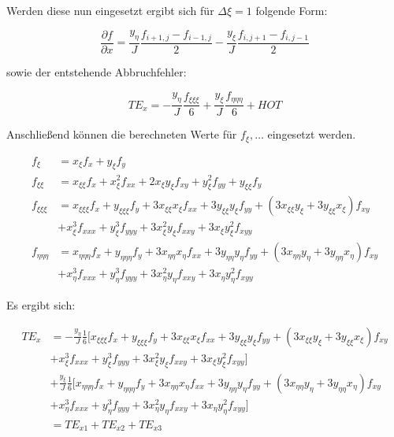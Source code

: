 \documentclass[11pt, ngerman,colorback,accentcolor=tud2d]{tudreport}
\newcommand{\pderf}[1]{\frac{\partial f}{\partial#1}}
\newcommand{\fxi}{f_{\xi}}
\newcommand{\fxxi}{f_{\xi\xi}}
\newcommand{\fxxxi}{f_{\xi\xi\xi}}
\newcommand{\xxi}{x_{\xi}}
\newcommand{\xxxi}{x_{\xi\xi}}
\newcommand{\xxxxi}{x_{\xi\xi\xi}}
\newcommand{\yxi}{y_{\xi}}
\newcommand{\yxxi}{y_{\xi\xi}}
\newcommand{\yxxxi}{y_{\xi\xi\xi}}
\newcommand{\feeeta}{f_{\eta\eta\eta}}
\newcommand{\xeta}{x_{\eta}}
\newcommand{\xeeta}{x_{\eta\eta}}
\newcommand{\xeeeta}{x_{\eta\eta\eta}}
\newcommand{\yeta}{y_{\eta}}
\newcommand{\yeeta}{y_{\eta\eta}}
\newcommand{\yeeeta}{y_{\eta\eta\eta}}
\begin{document}
Werden diese nun eingesetzt ergibt sich für $\Delta \xi = 1$ folgende Form:

\begin{equation}
  \pderf{x}=\frac{y_{\eta}}{J}\frac{f_{i+1,j}-f_{i-1,j}}{2}
  - \frac{y_{\xi}}{J}\frac{f_{i,j+1}-f_{i,j-1}}{2}
\end{equation}

sowie der entstehende Abbruchfehler:

\begin{equation}
  TE_x = -\frac{y_{\eta}}{J}\frac{f_{\xi\xi\xi}}{6}
  + \frac{y_{\xi}}{J}\frac{f_{\eta\eta\eta}}{6}+HOT
\end{equation}

Anschließend können die berechneten Werte für $f_{\xi},\dots$
eingesetzt werden.

\begin{align*}
  \fxi &= \xxi f_x + \yxi f_y\\
  \fxxi &= \xxxi f_x + \xxi^2f_{xx}+2\xxi \yxi f_{xy}
  +\yxi^2 f_{yy} + \yxxi f_y\\
  \fxxxi &= \xxxxi f_x + \yxxxi f_y + 3 \xxxi\xxi f_{xx}+
  3 \yxxi\yxi f_{yy} + \left({3\xxxi\yxi+3\yxxi\xxi}\right)f_{xy}\\
  &+ \xxi^3f_{xxx}+\yxi^3f_{yyy}+3\xxi^2\yxi f_{xxy}+3\xxi\yxi^2f_{xyy}\\
 \feeeta &= \xeeeta f_x + \yeeeta f_y + 3 \xeeta\xeta f_{xx}+
  3 \yeeta\yeta f_{yy} + \left({3\xeeta\yeta+3\yeeta\xeta}\right)f_{xy}\\
  &+ \xeta^3f_{xxx}+\yeta^3f_{yyy}+3\xeta^2\yeta f_{xxy}+3\xeta\yeta^2f_{xyy}
\end{align*}

Es ergibt sich:

\begin{align*}
  TE_x&= -\frac{y_{\eta}}{J} \frac{1}{6}\Big[\xxxxi f_x + \yxxxi f_y + 3 \xxxi\xxi f_{xx}+
  3 \yxxi\yxi f_{yy} + \left({3\xxxi\yxi+3\yxxi\xxi}\right)f_{xy}\\
&+ \xxi^3f_{xxx}+\yxi^3f_{yyy}+3\xxi^2\yxi f_{xxy}+3\xxi\yxi^2f_{xyy}\Big]\\
&+  \frac{y_{\xi}}{J}\frac{1}{6} \Big[\xeeeta f_x + \yeeeta f_y + 3 \xeeta\xeta f_{xx}+
  3 \yeeta\yeta f_{yy} + \left({3\xeeta\yeta+3\yeeta\xeta}\right)f_{xy}\\
  &+ \xeta^3f_{xxx}+\yeta^3f_{yyy}+3\xeta^2\yeta f_{xxy}+3\xeta\yeta^2f_{xyy}
\Big]\\
  &= TE_{x1} + TE_{x2} + TE_{x3}
\end{align*}
\end{document}
